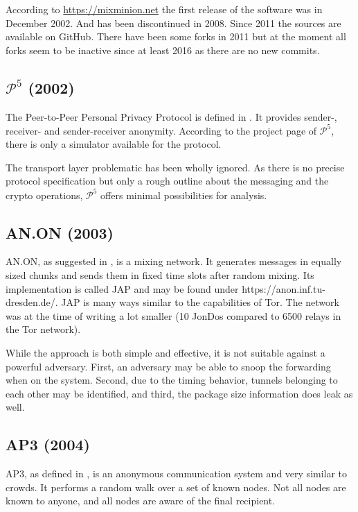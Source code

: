 According to \url{https://mixminion.net} the first release of the software was in December 2002. And has been discontinued in 2008. Since 2011 the sources are available on GitHub. There have been some forks in 2011 but at the moment all forks seem to be inactive since at least 2016 as there are no new commits.

\subsection{\texorpdfstring{$\mathcal{P}^5$}{P5} (2002)}
The Peer-to-Peer Personal Privacy Protocol is defined in \cite{sherwood-protocol}. It provides sender-, receiver- and sender-receiver anonymity. According to the project page of $\mathcal{P}^5$, there is only a simulator available for the protocol.

The transport layer problematic has been wholly ignored. As there is no precise protocol specification but only a rough outline about the messaging and the crypto operations, $\mathcal{P}^5$ offers minimal possibilities for analysis.

\subsection{AN.ON (2003)}
AN.ON, as suggested in \cite{federrath2003system}, is a mixing network. It generates messages in equally sized chunks and sends them in fixed time slots after random mixing. Its implementation is called JAP and may be found under https://anon.inf.tu-dresden.de/. JAP is many ways similar to the capabilities of Tor. The network was at the time of writing a lot smaller (10 JonDos compared to 6500 relays in the Tor network).

While the approach is both simple and effective, it is not suitable against a powerful adversary. First, an adversary may be able{\tiny } to snoop the forwarding when on the system. Second, due to the timing behavior, tunnels belonging to each other may be identified, and third, the package size information does leak as well.


\subsection{AP3 (2004)}
AP3, as defined in \cite{mislove2004ap3}, is an anonymous communication system and very similar to crowds. It performs a random walk over a set of known nodes. Not all nodes are known to anyone, and all nodes are aware of the final recipient. 

